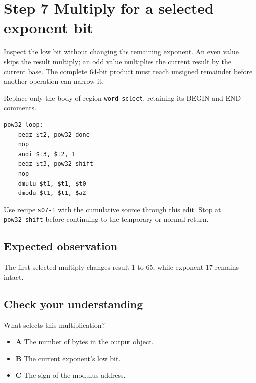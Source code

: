\section{Step 7 Multiply for a selected exponent bit}\label{rsa-s07}

Inspect the low bit without changing the remaining exponent. An even value skips the result multiply; an odd value multiplies the current result by the current base. The complete 64-bit product must reach unsigned remainder before another operation can narrow it.

Replace only the body of region \texttt{word\_select}, retaining its BEGIN and END comments.

\begin{verbatim}
pow32_loop:
    beqz $t2, pow32_done
    nop
    andi $t3, $t2, 1
    beqz $t3, pow32_shift
    nop
    dmulu $t1, $t1, $t0
    dmodu $t1, $t1, $a2
\end{verbatim}

Use recipe \texttt{s07-1} with the cumulative source through this edit. Stop at \texttt{pow32\_shift} before continuing to the temporary or normal return.

\subsection{Expected observation}
The first selected multiply changes result 1 to 65, while exponent 17 remains intact.

\subsection{Check your understanding}
What selects this multiplication?

\begin{itemize}
  \item \textbf{A} The number of bytes in the output object.
  \item \textbf{B} The current exponent's low bit.
  \item \textbf{C} The sign of the modulus address.
\end{itemize}
